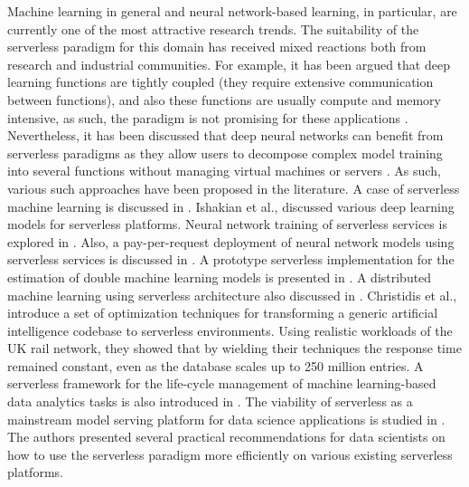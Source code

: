 Machine learning in general and neural network-based learning, in particular, are currently one of the most attractive research trends. The suitability of the serverless paradigm for this domain has received mixed reactions both from research and industrial communities. For example, it has been argued that deep learning functions are tightly coupled (they require extensive communication between functions), and also these functions are usually compute and memory intensive, as such, the paradigm is not promising for these applications . Nevertheless, it has been discussed that deep neural networks can benefit from serverless paradigms as they allow users to decompose complex model training into several functions without managing virtual machines or servers . As such, various such approaches have been proposed in the literature. A case of serverless machine learning is discussed in . Ishakian et al.,  discussed various deep learning models for serverless platforms. Neural network training of serverless services is explored in . Also, a pay-per-request deployment of neural network models using serverless services is discussed in . A prototype serverless implementation for the estimation of double machine learning models is presented in . A distributed machine learning using serverless architecture also discussed in .
Christidis et al.,  introduce a set of optimization techniques for transforming a generic artificial intelligence codebase to serverless environments. Using realistic workloads of the UK rail network, they showed that by wielding their techniques the response time remained constant, even as the database scales up to 250 million entries. A serverless framework for the life-cycle management of machine learning-based data analytics tasks is also introduced in .
The viability of serverless as a mainstream model serving platform for data science applications is studied in . The authors presented several practical recommendations for data scientists on how to use the serverless paradigm more efficiently on various existing serverless platforms.

